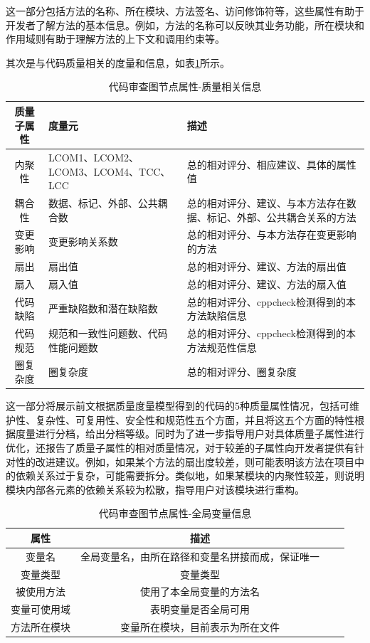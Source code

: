 这一部分包括方法的名称、所在模块、方法签名、访问修饰符等，这些属性有助于开发者了解方法的基本信息。例如，方法的名称可以反映其业务功能，所在模块和作用域则有助于理解方法的上下文和调用约束等。

其次是与代码质量相关的度量和信息，如表\ref{4_代码审查图节点属性-质量相关信息}所示。

\begin{table}[htbp]
    \caption{代码审查图节点属性-质量相关信息}
    \label{4_代码审查图节点属性-质量相关信息}
    \vspace{0.5em}\centering\wuhao
    \begin{tabular}{cp{6cm}p{6cm}}
    \toprule
    质量子属性 & 度量元 & 描述 \\
    \midrule
    内聚性& LCOM1、LCOM2、LCOM3、LCOM4、TCC、LCC &  总的相对评分、相应建议、具体的属性值 \\           
    耦合性& 数据、标记、外部、公共耦合数 &  总的相对评分、建议、与本方法存在数据、标记、外部、公共耦合关系的方法 \\       
    变更影响 & 变更影响关系数 & 总的相对评分、与本方法存在变更影响的方法 \\
    扇出 &扇出值 &  总的相对评分、建议、方法的扇出值 \\
    扇入 &扇入值 &  总的相对评分、建议、方法的扇入值 \\ 
    代码缺陷 & 严重缺陷数和潜在缺陷数 &  总的相对评分、cppcheck检测得到的本方法缺陷信息 \\    
    代码规范 &  规范和一致性问题数、代码性能问题数 &  总的相对评分、cppcheck检测得到的本方法规范性信息 \\    
    圈复杂度 & 圈复杂度 & 总的相对评分、圈复杂度\\    
    \bottomrule
    \end{tabular}
    \end{table}

这一部分将展示前文根据质量度量模型得到的代码的5种质量属性情况，包括可维护性、复杂性、可复用性、安全性和规范性五个方面，并且将这五个方面的特性根据度量进行分档，给出分档等级。同时为了进一步指导用户对具体质量子属性进行优化，还报告了质量子属性的相对质量情况，对于较差的子属性向开发者提供有针对性的改进建议。例如，如果某个方法的扇出度较差，则可能表明该方法在项目中的依赖关系过于复杂，可能需要拆分。类似地，如果某模块的内聚性较差，则说明模块内部各元素的依赖关系较为松散，指导用户对该模块进行重构。

\begin{table}[htbp]
\caption{代码审查图节点属性-全局变量信息}
\label{4_代码审查图节点属性-全局变量信息}
\vspace{0.5em}\centering\wuhao
\begin{tabular}{cccc}
\toprule
    属性 & 描述 \\
\midrule
变量名 & 全局变量名，由所在路径和变量名拼接而成，保证唯一  \\
变量类型 & 变量类型   \\
被使用方法 & 使用了本全局变量的方法名   \\
变量可使用域 & 表明变量是否全局可用   \\
方法所在模块 &  变量所在模块，目前表示为所在文件  \\  
\bottomrule
\end{tabular}
\end{table}


